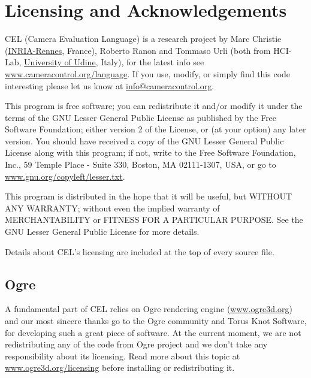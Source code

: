 \section{Licensing and Acknowledgements} \label{licensing}

    CEL (Camera Evaluation Language) is a research project by Marc Christie (\href{http://www.inria.fr}{INRIA-Rennes}, France), Roberto Ranon and Tommaso Urli (both from HCI-Lab, \href{http://www.uniud.it}{University of Udine}, Italy), for the latest info see \href{http://www.cameracontrol.org/language}{www.cameracontrol.org/language}. If you use, modify, or simply find this code interesting please let us know at \href{mailto:info@cameracontrol.org}{info@cameracontrol.org}.
    
    
    This program is free software; you can redistribute it and/or modify it under the terms of the GNU Lesser General Public License as published by the Free Software Foundation; either version 2 of the License, or (at your option) any later version. You should have received a copy of the GNU Lesser General Public License along with this program; if not, write to the Free Software Foundation, Inc., 59 Temple Place - Suite 330, Boston, MA 02111-1307, USA, or go to \href{http://www.gnu.org/copyleft/lesser.txt}{www.gnu.org/copyleft/lesser.txt}.
    
    This program is distributed in the hope that it will be useful, but WITHOUT ANY WARRANTY; without even the implied warranty of MERCHANTABILITY or FITNESS FOR A PARTICULAR PURPOSE. See the GNU Lesser General Public License for more details. 
    
    Details about CEL's licensing are included at the top of every source file.

    \subsection{Ogre}
    
        A fundamental part of CEL relies on Ogre rendering engine (\href{http://www.ogre3d.org}{www.ogre3d.org}) and our most sincere thanks go to the Ogre community and Torus Knot Software, for developing such a great piece of software. At the current moment, we are not redistributing any of the code from Ogre project and we don't take any responsibility about its licensing. Read more about this topic at \href{http://www.ogre3d.org/licensing}{www.ogre3d.org/licensing} before installing or redistributing it.
        
